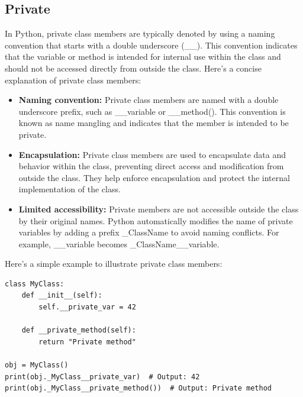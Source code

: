 \documentclass{report}
\begin{document}
    \subsection{Private}
    In Python, private class members are typically denoted by using a naming convention that starts with a double underscore (\_\_). This convention indicates that the variable or method is intended for internal use within the class and should not be accessed directly from outside the class. Here's a concise explanation of private class members:
    \begin{itemize}
        \item \textbf{Naming convention:} Private class members are named with a double underscore prefix, such as \_\_variable or \_\_method(). This convention is known as name mangling and indicates that the member is intended to be private.
        \item \textbf{Encapsulation:} Private class members are used to encapsulate data and behavior within the class, preventing direct access and modification from outside the class. They help enforce encapsulation and protect the internal implementation of the class.
        \item \textbf{Limited accessibility:} Private members are not accessible outside the class by their original names. Python automatically modifies the name of private variables by adding a prefix \_ClassName to avoid naming conflicts. For example, \_\_variable becomes \_ClassName\_\_variable.
    \end{itemize}
    \bigbreak \noindent 
    \bigbreak \noindent 
    Here's a simple example to illustrate private class members:
    \begin{verbatim}
class MyClass:
    def __init__(self):
        self.__private_var = 42

    def __private_method(self):
        return "Private method"

obj = MyClass()
print(obj._MyClass__private_var)  # Output: 42
print(obj._MyClass__private_method())  # Output: Private method
    \end{verbatim}

    \pagebreak \bigbreak \noindent
\end{document}
